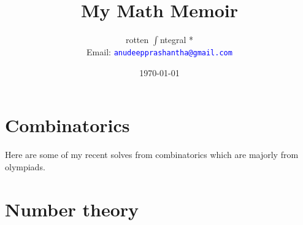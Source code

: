 \documentclass[a4paper, 11pt, openany]{book}
\title{\textbf{My Math Memoir}}
\author{rotten $\int$ntegral *\\Email: \textcolor{blue}{\texttt{anudeepprashantha@gmail.com}}}
\date{\today}
\begin{document}
\maketitle
    \tableofcontents

	\chapter{Combinatorics}
	\noindent Here are some of my recent solves from combinatorics which are majorly from olympiads. 
	
	
	
	
	
	


	\chapter{Number theory}
	
	
\end{document}
